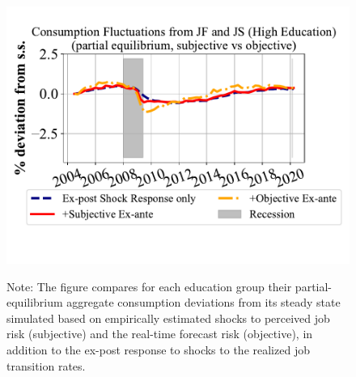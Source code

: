 \begin{figure}
\vspace{-2em}
\includegraphics[width=0.6\linewidth]{text/chapter2/Figures/consumption_pe_JS_JF_deviation_machine_as_rational_HighEdu.pdf}
      \begin{flushleft}\footnotesize {Note: The figure compares for each education group their partial-equilibrium aggregate consumption deviations from its steady state simulated based on empirically estimated shocks to perceived job risk (subjective) and the real-time forecast risk (objective), in addition to the ex-post response to shocks to the realized job transition rates.} \end{flushleft}
    \end{figure}